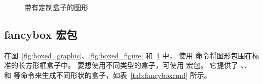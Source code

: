 \begin{figure}
	\centering
	\setlength{\fboxrule}{3pt}
	\setlength{\fboxsep}{1cm}
	\caption{带有定制盒子的图形}
	\label{fig:boxed_custom}
\end{figure}


\subsection{fancybox 宏包} \label{ssec:fancybox}

在图~\ref{fig:boxed_graphic}、\ref{fig:boxed_figure} 和~\ref{fig:boxed_custom} 中，
使用  命令将图形包围在标准的长方形框盒子中。
要想使用不同类型的盒子，可使用  宏包。
它提供了 、、 和  等命令来生成不同形状的盒子，如表~\ref{tab:fancyboxcmd} 所示。

